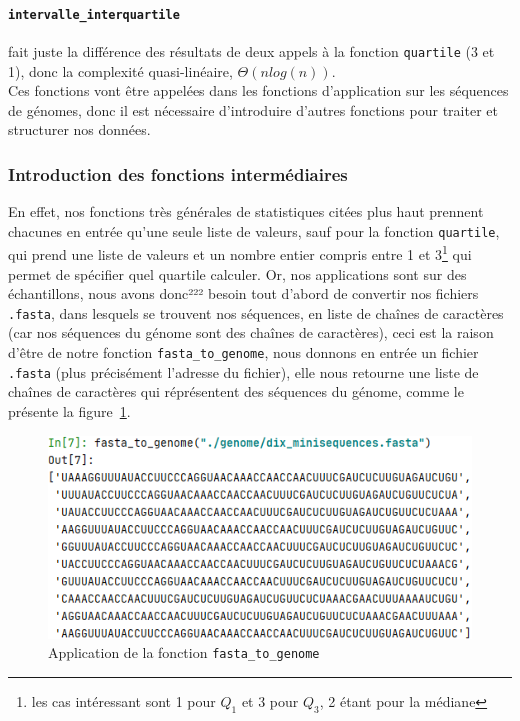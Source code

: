 \documentclass[12pt]{article}
\begin{document}
\paragraph{\texttt{intervalle\_interquartile}} fait juste la différence des résultats de deux appels à la fonction \texttt{quartile} (3 et 1), donc la complexité quasi-linéaire, $\Theta(nlog(n))$.\\

Ces fonctions vont être appelées dans les fonctions d'application sur les séquences de génomes, donc il est nécessaire d'introduire d'autres fonctions pour traiter et structurer nos données.



\subsubsection{Introduction des fonctions intermédiaires}
En effet, nos fonctions très générales de statistiques citées plus haut prennent chacunes en entrée qu'une seule liste de valeurs, sauf pour la fonction \texttt{quartile}, qui prend une liste de valeurs et un nombre entier compris entre 1 et 3\footnote{les cas intéressant sont 1 pour $Q_1$ et 3 pour $Q_3$, 2 étant pour la médiane} qui permet de spécifier quel quartile calculer. Or, nos applications sont sur des échantillons, nous avons donc²²² besoin tout d'abord de convertir nos fichiers \texttt{.fasta}, dans lesquels se trouvent nos séquences, en liste de chaînes de caractères (car nos séquences du génome sont des chaînes de caractères), ceci est la raison d'être de notre fonction \texttt{fasta\_to\_genome}, nous donnons en entrée un fichier \texttt{.fasta} (plus précisément l'adresse du fichier), elle nous retourne une liste de chaînes de caractères qui réprésentent des séquences du génome, comme le présente la figure~\ref{appfasta}. 
    \begin{figure}[!h]
        \centering
        \includegraphics[scale = 0.85]{Images/Stats/app_fasta_to_genome.PNG}
        \caption{Application de la fonction \texttt{fasta\_to\_genome}}
        \label{appfasta}
    \end{figure}
\end{document}
